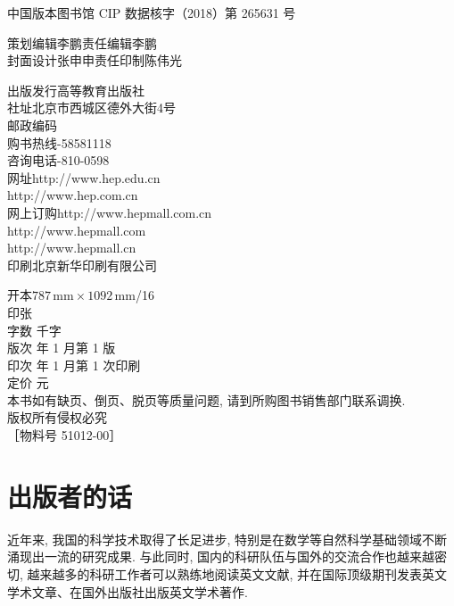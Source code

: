 \begin{titlepage}
\begin{minipage}[t]{91mm}
中国版本图书馆 CIP 数据核字（2018）第 265631 号
\end{minipage}
\par\vfill
\noindent 策划编辑\quad 李\quad 鹏\qquad 责任编辑\quad 李\quad 鹏\\
封面设计\quad 张申申\qquad 责任印制\quad 陈伟光
\par\vspace{5mm}
\noindent\begin{minipage}[t]{69mm}\fontsize{7}{10}\selectfont
出版发行\quad 高等教育出版社\\
社址\quad 北京市西城区德外大街4号\\
邮政编码\\
购书热线-58581118\\
咨询电话-810-0598\\
网址\quad http://www.hep.edu.cn\\
http://www.hep.com.cn\\
网上订购\quad http://www.hepmall.com.cn\\
http://www.hepmall.com\\
http://www.hepmall.cn\\
印刷\quad 北京新华印刷有限公司
\end{minipage}\hfill
\begin{minipage}[t]{66mm}\fontsize{7}{10}\selectfont
开本\quad $787\,\mathrm{mm}\times1092\,\mathrm{mm}$/16\\
印张\\
字数 千字\\
版次 年 1 月第 1 版\\
印次 年 1 月第 1 次印刷\\
定价 元\\[3mm]
本书如有缺页、倒页、脱页等质量问题, 请到所购图书销售部门联系调换.\\
版权所有\quad 侵权必究\\
［物料号 51012-00］
\end{minipage}
\end{titlepage}

\chapter*{出版者的话}
近年来, 我国的科学技术取得了长足进步, 特别是在数学等自然科学基础领域不断涌现出一流的研究成果. 与此同时, 国内的科研队伍与国外的交流合作也越来越密切, 越来越多的科研工作者可以熟练地阅读英文文献, 并在国际顶级期刊发表英文学术文章、在国外出版社出版英文学术著作.

